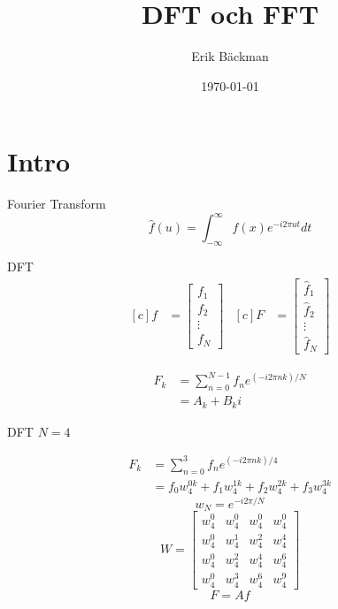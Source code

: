 \documentclass[presentation]{beamer}
\author{Erik Bäckman}
\date{\today}
\title{DFT och FFT}
\begin{document}
\maketitle
\section{Intro}
\label{sec:org79b13eb}

\begin{frame}[label={sec:org5204ad8}]{Fourier Transform}
\[ \hat{f}(u) = \int_{-\infty}^{\infty} f(x)e^{-i2 \pi ut}dt \]
\end{frame}

\begin{frame}[label={sec:org1596679}]{DFT}
\begin{equation*}
\begin{aligned}[c]
f &=
  \begin{bmatrix}
    f_{1} \\
    f_{2} \\
    \vdots \\
    f_{N}
    \end{bmatrix}
\end{aligned}
\begin{aligned}[c]
F &=
  \begin{bmatrix}
    \hat{f}_{1} \\
    \hat{f}_{2} \\
    \vdots \\
    \hat{f}_{N}
    \end{bmatrix}
\end{aligned}
\end{equation*}

\begin{align*}
F_{k} &= \sum_{n=0}^{N-1} f_{n} e^{(-i2 \pi nk)/N} \\
      &= A_{k} + B_{k}i
\end{align*}
\end{frame}

\begin{frame}[label={sec:orgf0c6cea}]{DFT}
\(N = 4\)

\begin{align*}
  F_{k} &= \sum_{n=0}^{3} f_{n} e^{(-i2 \pi nk)/4} \\
  &= f_{0}w_{4}^{0k} + f_{1}w_{4}^{1k} + f_{2}w_{4}^{2k} + f_{3}w_{4}^{3k}
\end{align*}
\begin{equation*}
w_{N} = e^{-i2 \pi/N}
\end{equation*}
\pause
\begin{equation*}
W =
\begin{bmatrix}
  w_{4}^{0} & w_{4}^{0} & w_{4}^{0} & w_{4}^{0} \\
  w_{4}^{0} & w_{4}^{1} & w_{4}^{2} & w_{4}^{4} \\
  w_{4}^{0} & w_{4}^{2} & w_{4}^{4} & w_{4}^{6} \\
  w_{4}^{0} & w_{4}^{3} & w_{4}^{6} & w_{4}^{9}
\end{bmatrix}
\end{equation*}
\begin{equation*}
F = Af
\end{equation*}
\end{frame}
\end{document}
